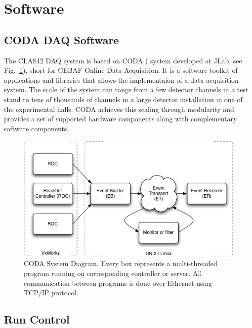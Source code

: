 \section{Software}

\subsection{CODA DAQ Software}

The CLAS12 DAQ system is based on CODA (\cite{coda-ref} system developed at JLab, see Fig.~\ref{fig:coda_diagram}), short for CEBAF Online Data Acquisition. It is a software toolkit of applications and libraries that allows the implementaion of a data acquisition system. The scale of the system can range from a few detector channels in a test stand to tens of thousands of channels in a large detector installation in one of the experimental halls. CODA achieves this scaling through modularity and provides a set of supported hardware components along with complementary software components.

\begin{figure}[hbt]
	\centering
	\includegraphics[width=1.0\columnwidth,keepaspectratio]{img/coda_diagram.png}
	\caption{CODA System Diagram. Every box represents a multi-threaded program running on corresponding controller or server. All communication between programs is done over Ethernet using TCP/IP protocol.}
	\label{fig:coda_diagram}
\end{figure}


\subsection {Run Control}

